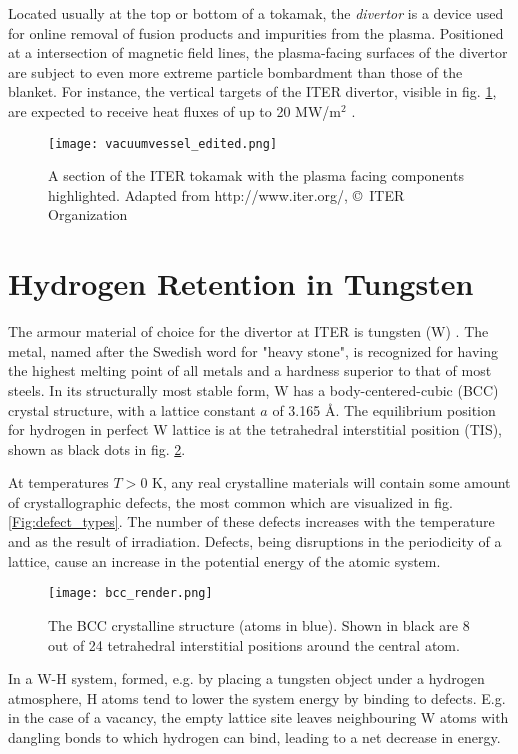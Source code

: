Located usually at the top or bottom of a tokamak, the \textit{divertor} is a device used for online removal of fusion products and impurities from the plasma.
Positioned at a intersection of magnetic field lines, the plasma-facing surfaces of the divertor are subject to even more extreme particle bombardment than those of the blanket.
For instance, the vertical targets of the ITER divertor, visible in fig. \ref{fig:ITERslice}, are expected to receive heat fluxes of up to 20 MW/m$^2$ \cite{Iter1234Divertor}. 

\begin{figure}[!ht]
\center
\texttt{[image: vacuumvessel\_edited.png]}
\caption{A section of the ITER tokamak with the plasma facing components highlighted. Adapted from http://www.iter.org/, \copyright~ITER Organization}
\label{fig:ITERslice}
\end{figure}

\section{Hydrogen Retention in Tungsten}
The armour material of choice for the divertor at ITER is tungsten (W) \cite{PITTS2013S48}.
The metal, named after the Swedish word for "heavy stone", is recognized for having the highest melting point of all metals and a hardness superior to that of most steels. 
In its structurally most stable form, W has a body-centered-cubic (BCC) crystal structure, with a lattice constant $a$ of 3.165 \AA.
The equilibrium position for hydrogen in perfect W lattice is at the tetrahedral interstitial position (TIS), shown as black dots in fig. \ref{Fig:bcc}. 

At temperatures $T > 0$ K, any real crystalline materials will contain some amount of crystallographic defects, the most common which are visualized in fig. \ref{Fig:defect_types}. 
The number of these defects increases with the temperature and as the result of irradiation. 
Defects, being disruptions in the periodicity of a lattice, cause an increase in the potential energy of the atomic system. 
\begin{figure}[!ht]
\center
\texttt{[image: bcc\_render.png]}
\caption{The BCC crystalline structure (atoms in blue). Shown in black are 8 out of 24 tetrahedral interstitial positions around the central atom.}
\label{Fig:bcc}
\end{figure}
In a W-H system, formed, e.g. by placing a tungsten object under a hydrogen atmosphere, H atoms tend to lower the system energy by binding to defects. 
E.g. in the case of a vacancy, the empty lattice site leaves neighbouring W atoms with dangling bonds to which hydrogen can bind, leading to a net decrease in energy.

